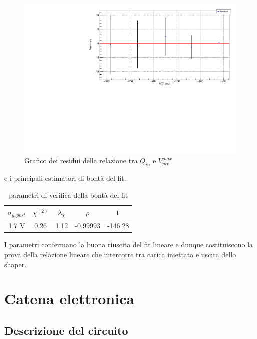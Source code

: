 \documentclass{article}
\begin{document}
\begin{center}
    \begin{figure}[H]
    \centering
    \includegraphics[scale=0.375, angle=0]{residuishaper.pdf}
    \caption{Grafico dei residui della relazione tra $Q_{in}$ e $V_{pre}^{max}$}
    \label{fig:residuishaper}
    \end{figure}
\end{center}

e i principali estimatori di bontà del fit.

\begin{table}[ht]
    \centering
    \begin{tabular}{ccccc}
        \toprule
        $\sigma_{y, post}$    &$\chi^{(2)}$    &$\lambda_{\chi}$   &$\rho$  &t   \\
        \midrule
        1.7 V               &0.26            &1.12              &-0.99993&-146.28\\
        \bottomrule
    \end{tabular}
    \caption{parametri di verifica della bontà del fit}
\end{table}

I parametri confermano la buona riuscita del fit lineare e dunque costituiscono la prova della relazione lineare che intercorre tra
carica iniettata e uscita dello shaper.

\section{Catena elettronica}

\subsection{Descrizione del circuito}
\end{document}
